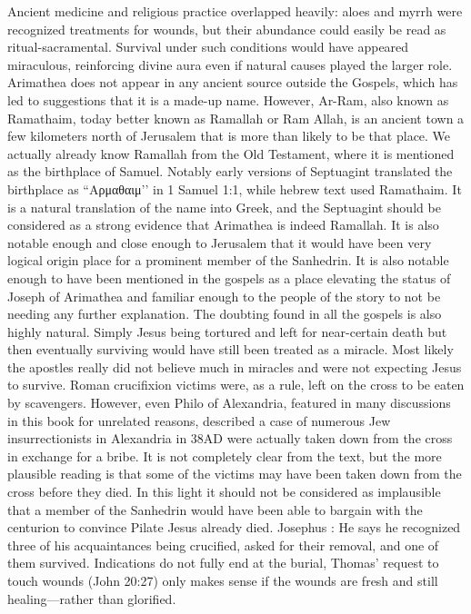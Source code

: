 Ancient medicine and religious practice overlapped heavily: aloes and myrrh were recognized treatments for wounds, but their abundance could easily be read as ritual-sacramental. Survival under such conditions would have appeared miraculous, reinforcing divine aura even if natural causes played the larger role.
Arimathea does not appear in any ancient source outside the Gospels, which has led to suggestions that it is a made-up name.
However, Ar-Ram, also known as Ramathaim, today better known as Ramallah or Ram Allah, is an ancient town a few kilometers north of Jerusalem that is more than likely to be that place.
We actually already know Ramallah from the Old Testament, where it is mentioned as the birthplace of Samuel.
Notably early versions of Septuagint translated the birthplace as ``Αρμαθαιμ’’ in 1 Samuel 1:1, while hebrew text used Ramathaim.
It is a natural translation of the name into Greek, and the Septuagint should be considered as a strong evidence that Arimathea is indeed Ramallah.
It is also notable enough and close enough to Jerusalem that it would have been very logical origin place for a prominent member of the Sanhedrin.
It is also notable enough to have been mentioned in the gospels as a place elevating the status of Joseph of Arimathea and familiar enough to the people of the story to not be needing any further explanation.
The doubting found in all the gospels is also highly natural.
Simply Jesus being tortured and left for near-certain death but then eventually surviving would have still been treated as a miracle.
Most likely the apostles really did not believe much in miracles and were not expecting Jesus to survive.
Roman crucifixion victims were, as a rule, left on the cross to be eaten by scavengers.
However, even Philo of Alexandria, featured in many discussions in this book for unrelated reasons, described a case \cite[83--84]{philo:flaccum} of numerous Jew insurrectionists in Alexandria in 38AD were actually taken down from the cross in exchange for a bribe.
It is not completely clear from the text, but the more plausible reading is that some of the victims may have been taken down from the cross before they died.
In this light it should not be considered as implausible that a member of the Sanhedrin would have been able to bargain with the centurion to convince Pilate Jesus already died.
Josephus \cite[420--421]{josephus:life}: He says he recognized three of his acquaintances being crucified, asked for their removal, and one of them survived.
Indications do not fully end at the burial, Thomas' request to touch wounds (John 20:27) only makes sense if the wounds are fresh and still healing---rather than glorified.

